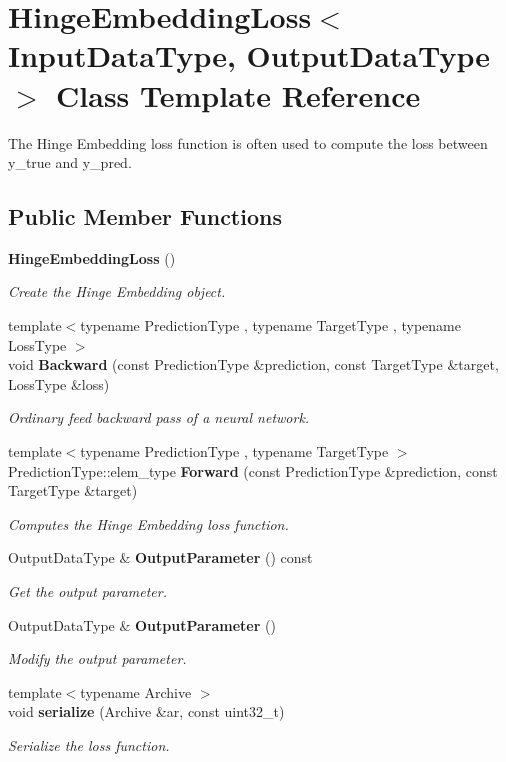 \section{Hinge\+Embedding\+Loss$<$ Input\+Data\+Type, Output\+Data\+Type $>$ Class Template Reference}
\label{classmlpack_1_1ann_1_1HingeEmbeddingLoss}


The Hinge Embedding loss function is often used to compute the loss between y\+\_\+true and y\+\_\+pred.  


\subsection*{Public Member Functions}
\begin{DoxyCompactItemize}
\item 
\textbf{ Hinge\+Embedding\+Loss} ()
\begin{DoxyCompactList}\small\item\em Create the Hinge Embedding object. \end{DoxyCompactList}\item 
{\footnotesize template$<$typename Prediction\+Type , typename Target\+Type , typename Loss\+Type $>$ }\\void \textbf{ Backward} (const Prediction\+Type \&prediction, const Target\+Type \&target, Loss\+Type \&loss)
\begin{DoxyCompactList}\small\item\em Ordinary feed backward pass of a neural network. \end{DoxyCompactList}\item 
{\footnotesize template$<$typename Prediction\+Type , typename Target\+Type $>$ }\\Prediction\+Type\+::elem\+\_\+type \textbf{ Forward} (const Prediction\+Type \&prediction, const Target\+Type \&target)
\begin{DoxyCompactList}\small\item\em Computes the Hinge Embedding loss function. \end{DoxyCompactList}\item 
Output\+Data\+Type \& \textbf{ Output\+Parameter} () const
\begin{DoxyCompactList}\small\item\em Get the output parameter. \end{DoxyCompactList}\item 
Output\+Data\+Type \& \textbf{ Output\+Parameter} ()
\begin{DoxyCompactList}\small\item\em Modify the output parameter. \end{DoxyCompactList}\item 
{\footnotesize template$<$typename Archive $>$ }\\void \textbf{ serialize} (Archive \&ar, const uint32\+\_\+t)
\begin{DoxyCompactList}\small\item\em Serialize the loss function. \end{DoxyCompactList}\end{DoxyCompactItemize}


